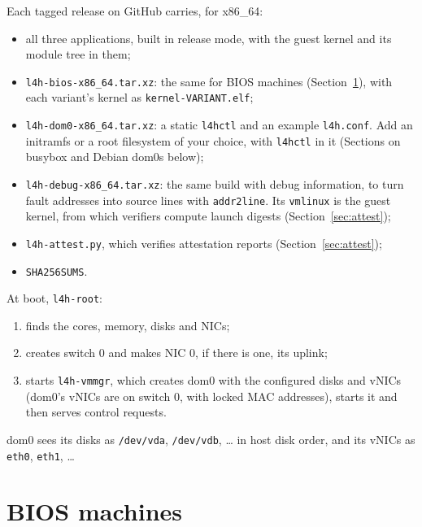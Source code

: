 \documentclass[11pt,a4paper]{report}
\newcommand{\cmd}[1]{\texttt{#1}}
\newcommand{\file}[1]{\texttt{#1}}
\begin{document}
Each tagged release on GitHub carries, for x86\_64:
\begin{itemize}
  \item all three applications, built in release mode, with the guest kernel
        and its module tree in them;
  \item \file{l4h-bios-x86\_64.tar.xz}: the same for BIOS machines
        (Section~\ref{sec:bios}), with each variant's kernel as
        \file{kernel-VARIANT.elf};
  \item \file{l4h-dom0-x86\_64.tar.xz}: a static \cmd{l4hctl} and an
        example \file{l4h.conf}. Add an initramfs or a root filesystem of
        your choice, with \cmd{l4hctl} in it (Sections on busybox and Debian
        dom0s below);
  \item \file{l4h-debug-x86\_64.tar.xz}: the same build with debug
        information, to turn fault addresses into source lines with
        \cmd{addr2line}. Its \file{vmlinux} is the guest kernel, from
        which verifiers compute launch digests
        (Section~\ref{sec:attest});
  \item \file{l4h-attest.py}, which verifies attestation reports
        (Section~\ref{sec:attest});
  \item \file{SHA256SUMS}.
\end{itemize}

At boot, \texttt{l4h-root}:
\begin{enumerate}
  \item finds the cores, memory, disks and NICs;
  \item creates switch 0 and makes NIC 0, if there is one, its uplink;
  \item starts \texttt{l4h-vmmgr}, which creates dom0 with the configured
        disks and vNICs (dom0's vNICs are on switch 0, with locked MAC
        addresses), starts it and then serves control requests.
\end{enumerate}
dom0 sees its disks as \file{/dev/vda}, \file{/dev/vdb}, \ldots{} in host
disk order, and its vNICs as \texttt{eth0}, \texttt{eth1}, \ldots

\section{BIOS machines}
\label{sec:bios}
\end{document}
